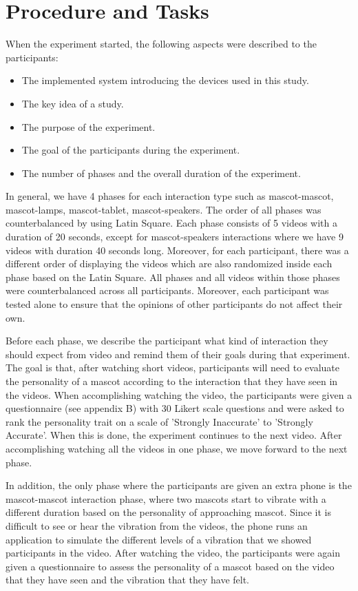 \section{Procedure and Tasks}
\label{sec:procedure-and-tasks}
When the experiment started, the following aspects were described to the participants:
\begin{itemize}
  \item The implemented system introducing the devices used in this study.
  \item The key idea of a study.
  \item The purpose of the experiment.
  \item The goal of the participants during the experiment.
  \item The number of phases and the overall duration of the experiment.
\end{itemize}


In general, we have 4 phases for each interaction type such as mascot-mascot,
mascot-lamps, mascot-tablet, mascot-speakers.
The order of all phases was counterbalanced by using Latin Square.
Each phase consists of 5 videos with a duration of 20 seconds, except for mascot-speakers
interactions where we have 9 videos with duration 40 seconds long.
Moreover, for each participant, there was a different order of displaying the videos
which are also randomized inside each phase based on the Latin Square.
All phases and all videos within those phases were counterbalanced across all participants.
Moreover, each participant was tested alone to ensure that the opinions of other participants do not affect their own.

Before each phase, we describe the participant what kind of interaction they should
expect from video and remind them of their goals during that experiment.
The goal is that, after watching short videos, participants will need to evaluate the personality
of a mascot according to the interaction that they have seen in the videos.
When accomplishing watching the video, the participants were given a questionnaire
(see appendix B) with 30 Likert scale questions and were asked to rank the personality trait
on a scale of 'Strongly Inaccurate' to 'Strongly Accurate'.
When this is done, the experiment continues to the next video.
After accomplishing watching all the videos in one phase, we move forward to the next phase.

In addition, the only phase where the participants are given an extra phone
is the mascot-mascot interaction phase, where two mascots start to vibrate
with a different duration based on the personality of approaching mascot.
Since it is difficult to see or hear the vibration from the videos, the phone runs an
application to simulate the different levels of a vibration that we showed participants in the video.
After watching the video, the participants were again given a questionnaire to assess
the personality of a mascot based on the video that they have seen and the vibration that they have felt.

